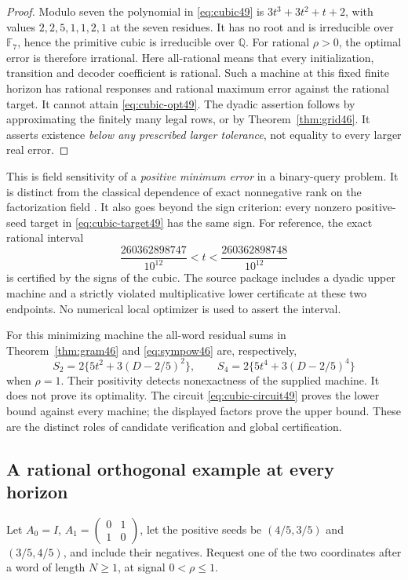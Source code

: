\begin{proof}
Modulo seven the polynomial in \eqref{eq:cubic49} is
$3t^3+3t^2+t+2$, with values $2,2,5,1,1,2,1$ at the seven residues.
It has no root and is irreducible over $\mathbb F_7$, hence the
primitive cubic is irreducible over $\mathbb Q$.
For rational $\rho>0$, the optimal error is therefore irrational.
Here all-rational means that every initialization, transition and decoder coefficient is rational. Such a machine at this fixed finite horizon has rational
responses and rational maximum error against the rational target.
It cannot attain \eqref{eq:cubic-opt49}.
The dyadic assertion follows by approximating the finitely many
legal rows, or by Theorem~\ref{thm:grid46}. It asserts existence
\emph{below any prescribed larger tolerance}, not equality to every
larger real error.
\end{proof}

This is field sensitivity of a \emph{positive minimum error} in a
binary-query problem. It is distinct from the classical dependence
of exact nonnegative rank on the factorization field
\cite{Shitov18}. It also goes beyond the sign criterion: every nonzero
positive-seed target in \eqref{eq:cubic-target49} has the same sign.
For reference, the exact rational interval
\[
 \frac{260362898747}{10^{12}}<t<
 \frac{260362898748}{10^{12}}
\]
is certified by the signs of the cubic. The source package includes
a dyadic upper machine and a strictly violated multiplicative lower
certificate at these two endpoints. No numerical local optimizer is
used to assert the interval.

For this minimizing machine the all-word residual sums in
Theorem~\ref{thm:gram46} and \eqref{eq:sympow46} are, respectively,
\[
 S_2=2\{5t^2+3(D-2/5)^2\},\qquad
 S_4=2\{5t^4+3(D-2/5)^4\}
\]
when $\rho=1$. Their positivity detects nonexactness of the supplied
machine. It does not prove its optimality. The circuit
\eqref{eq:cubic-circuit49} proves the lower bound against every
machine; the displayed factors prove the upper bound. These are the
distinct roles of candidate verification and global certification.

\subsection{A rational orthogonal example at every horizon}
Let $A_0=I$, $A_1=\left(\begin{smallmatrix}0&1\\1&0\end{smallmatrix}\right)$,
let the positive seeds be $(4/5,3/5)$ and $(3/5,4/5)$, and include
their negatives. Request one of the two coordinates after a word of
length $N\ge1$, at signal $0<\rho\le1$.

